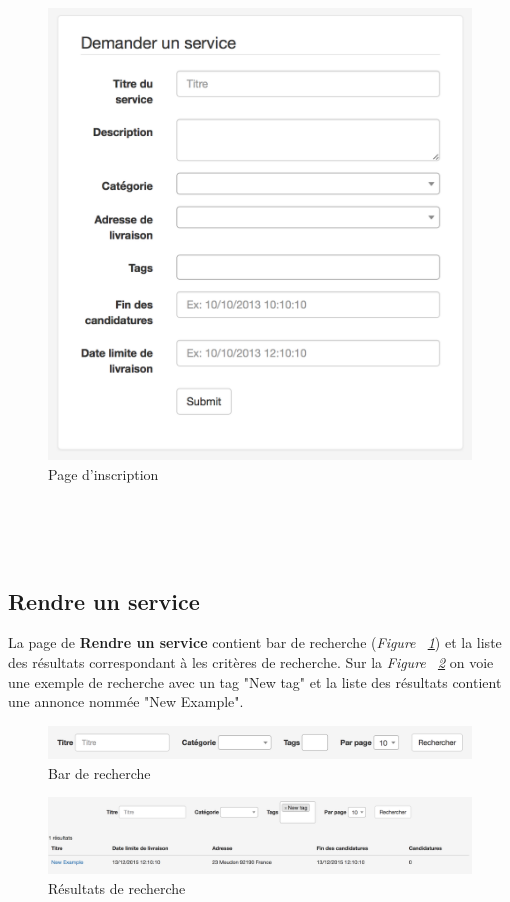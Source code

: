 \begin{minipage}{0.45\textwidth}
	\begin{figure}[H]
		\includegraphics[width=1\textwidth]{images/manuel/demander}
		\caption{Page d'inscription }
	\end{figure}
\end{minipage}\\\\\\


\subsection{Rendre un service}
La page de \textbf{Rendre un service} contient bar de recherche (\textit{Figure ~\ref{fig:recherche}}) et la liste des résultats correspondant à les critères de recherche. Sur la \textit{Figure ~\ref{fig:resultat}} on voie une exemple de recherche avec un tag "New tag" et la liste des résultats contient une annonce nommée "New Example". 

\begin{figure}[H]
	\includegraphics[width=1\textwidth]{images/manuel/recherche}
	\caption{Bar de recherche }
	\label{fig:recherche}
\end{figure}
\begin{figure}[H]
	\includegraphics[width=1\textwidth]{images/manuel/resultat}
	\caption{Résultats de recherche }
	\label{fig:resultat}
\end{figure}

